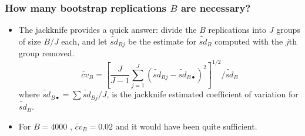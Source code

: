 \documentclass{beamer}
\begin{document}
\begin{frame}
\frametitle{How many bootstrap replications $B$ are necessary?}
\begin{itemize}
\item The jackknife provides a quick answer: divide the $B$ replications into $J$ groups of size $B/J$ each, and let $\tilde{sd}_{B j}$ be the estimate for $\tilde{sd}_{B}$ computed with the $j$th group removed.
$$ \tilde{cv}_B = \left[ \frac{J}{J-1} \sum_{j=1} ^J ( \tilde{sd}_{B j}- \tilde{sd}_{B \bullet})^2 \right]^{1/2} \Big/ \tilde{sd}_B $$
where $ \tilde{sd}_{B \bullet} = \sum \tilde{sd}_{B j}/J$, is the jackknife estimated coefficient of variation for $\tilde{sd}_B$.
\item  For $B= 4000$ , $ \tilde{cv}_B = 0.02$ and it would have been quite sufficient.
\end{itemize}
\end{frame}
\end{document}

